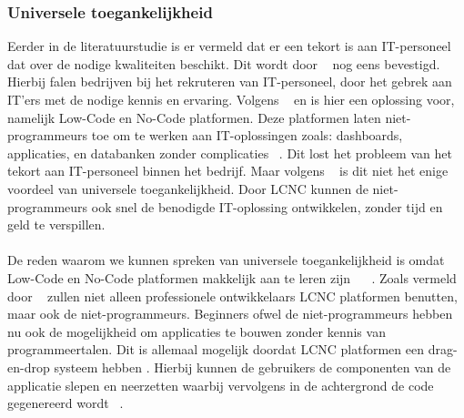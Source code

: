 \subsubsection{Universele toegankelijkheid}
\label{subsec:universele-toegankelijkheid}
Eerder in de literatuurstudie is er vermeld dat er een tekort is aan IT-personeel dat over de nodige kwaliteiten beschikt. 
Dit wordt door ~\textcite{Sufi_2023} nog eens bevestigd. Hierbij falen bedrijven bij het rekruteren van IT-personeel, door het gebrek aan 
IT'ers met de nodige kennis en ervaring. Volgens ~\textcite{Sufi_2023} en \textcite{Hirzel2022} is hier een oplossing voor, namelijk Low-Code en No-Code platformen. 
Deze platformen laten niet-programmeurs toe om te werken aan IT-oplossingen zoals: dashboards, applicaties, 
en databanken zonder complicaties ~\autocite{Sufi_2023}. Dit lost het probleem van het tekort aan IT-personeel binnen het bedrijf. 
Maar volgens ~\textcite{Sufi_2023} is dit niet het enige voordeel van universele toegankelijkheid. Door LCNC kunnen de niet-programmeurs ook snel de 
benodigde IT-oplossing ontwikkelen, zonder tijd en geld te verspillen.
\\
\\
De reden waarom we kunnen spreken van universele toegankelijkheid is omdat Low-Code en No-Code platformen makkelijk aan te leren zijn ~\autocite{ALSAADI_2021} ~\autocite{Sufi_2023}. 
Zoals vermeld door ~\textcite{ALSAADI_2021} zullen niet alleen professionele ontwikkelaars LCNC platformen benutten, maar ook de niet-programmeurs. 
Beginners ofwel de niet-programmeurs hebben nu ook de mogelijkheid om applicaties te bouwen zonder kennis van programmeertalen. 
Dit is allemaal mogelijk doordat LCNC platformen een drag-en-drop systeem hebben \autocite{Oluwaseyi2024}. Hierbij kunnen 
de gebruikers de componenten van de applicatie slepen en neerzetten waarbij vervolgens in de achtergrond de code gegenereerd wordt ~\autocite{ALSAADI_2021}.
